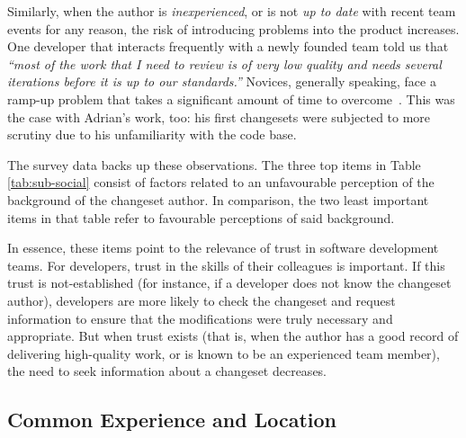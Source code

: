 Similarly, when the author is \emph{inexperienced}, or is not \emph{up to date} with recent team events for any reason, the risk of introducing problems into the product increases. One developer that interacts frequently with a newly founded team told us that \emph{``most of the work that I need to review is of very low quality and needs several iterations before it is up to our standards.''} Novices, generally speaking, face a ramp-up problem that takes a significant amount of time to overcome~\cite{begel:sigcse:2008}. This was the case with Adrian's work, too: his first changesets were subjected to more scrutiny due to his unfamiliarity with the code base.

The survey data backs up these observations. The three top items in Table \ref{tab:sub-social} consist of factors related to an unfavourable perception of the background of the changeset author. In comparison, the two least important items in that table refer to favourable perceptions of said background.

In essence, these items point to the relevance of trust in software development teams. For developers, trust in the skills of their colleagues is important. If this trust is not-established (for instance, if a developer does not know the changeset author), developers are more likely to check the changeset and request information to ensure that the modifications were truly necessary and appropriate. But when trust exists (that is, when the author has a good record of delivering high-quality work, or is known to be an experienced team member), the need to seek information about a changeset decreases. 





\subsection{Common Experience and Location}

